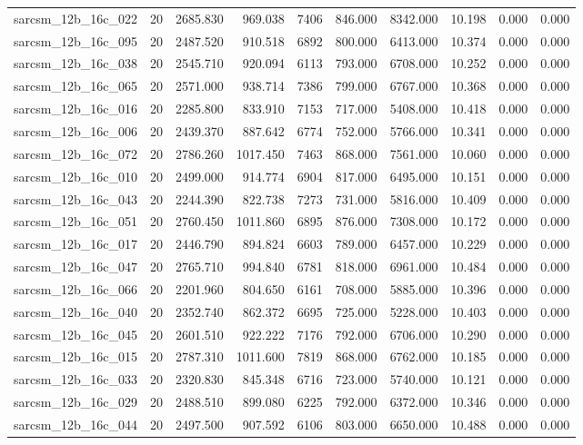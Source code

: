 \begin{tabular}{lrrrrrrrrr}
sarcsm\_12b\_16c\_022 & 20 & 2685.830 & 969.038 & 7406 & 846.000 & 8342.000 & 10.198 & 0.000 & 0.000 \\
sarcsm\_12b\_16c\_095 & 20 & 2487.520 & 910.518 & 6892 & 800.000 & 6413.000 & 10.374 & 0.000 & 0.000 \\
sarcsm\_12b\_16c\_038 & 20 & 2545.710 & 920.094 & 6113 & 793.000 & 6708.000 & 10.252 & 0.000 & 0.000 \\
sarcsm\_12b\_16c\_065 & 20 & 2571.000 & 938.714 & 7386 & 799.000 & 6767.000 & 10.368 & 0.000 & 0.000 \\
sarcsm\_12b\_16c\_016 & 20 & 2285.800 & 833.910 & 7153 & 717.000 & 5408.000 & 10.418 & 0.000 & 0.000 \\
sarcsm\_12b\_16c\_006 & 20 & 2439.370 & 887.642 & 6774 & 752.000 & 5766.000 & 10.341 & 0.000 & 0.000 \\
sarcsm\_12b\_16c\_072 & 20 & 2786.260 & 1017.450 & 7463 & 868.000 & 7561.000 & 10.060 & 0.000 & 0.000 \\
sarcsm\_12b\_16c\_010 & 20 & 2499.000 & 914.774 & 6904 & 817.000 & 6495.000 & 10.151 & 0.000 & 0.000 \\
sarcsm\_12b\_16c\_043 & 20 & 2244.390 & 822.738 & 7273 & 731.000 & 5816.000 & 10.409 & 0.000 & 0.000 \\
sarcsm\_12b\_16c\_051 & 20 & 2760.450 & 1011.860 & 6895 & 876.000 & 7308.000 & 10.172 & 0.000 & 0.000 \\
sarcsm\_12b\_16c\_017 & 20 & 2446.790 & 894.824 & 6603 & 789.000 & 6457.000 & 10.229 & 0.000 & 0.000 \\
sarcsm\_12b\_16c\_047 & 20 & 2765.710 & 994.840 & 6781 & 818.000 & 6961.000 & 10.484 & 0.000 & 0.000 \\
sarcsm\_12b\_16c\_066 & 20 & 2201.960 & 804.650 & 6161 & 708.000 & 5885.000 & 10.396 & 0.000 & 0.000 \\
sarcsm\_12b\_16c\_040 & 20 & 2352.740 & 862.372 & 6695 & 725.000 & 5228.000 & 10.403 & 0.000 & 0.000 \\
sarcsm\_12b\_16c\_045 & 20 & 2601.510 & 922.222 & 7176 & 792.000 & 6706.000 & 10.290 & 0.000 & 0.000 \\
sarcsm\_12b\_16c\_015 & 20 & 2787.310 & 1011.600 & 7819 & 868.000 & 6762.000 & 10.185 & 0.000 & 0.000 \\
sarcsm\_12b\_16c\_033 & 20 & 2320.830 & 845.348 & 6716 & 723.000 & 5740.000 & 10.121 & 0.000 & 0.000 \\
sarcsm\_12b\_16c\_029 & 20 & 2488.510 & 899.080 & 6225 & 792.000 & 6372.000 & 10.346 & 0.000 & 0.000 \\
sarcsm\_12b\_16c\_044 & 20 & 2497.500 & 907.592 & 6106 & 803.000 & 6650.000 & 10.488 & 0.000 & 0.000 \\

\end{tabular}

